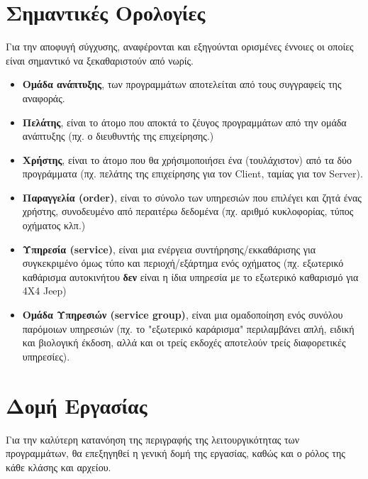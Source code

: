     \section{Σημαντικές Ορολογίες}
    \label{sec:SectionName1.2}
    Για την αποφυγή σύγχυσης, αναφέρονται και εξηγούνται ορισμένες έννοιες οι οποίες είναι σημαντικό να ξεκαθαριστούν από νωρίς.

    \begin{itemize}
        \item \textbf{Ομάδα ανάπτυξης}, των προγραμμάτων αποτελείται από τους συγγραφείς της αναφοράς.
        
        \item \textbf{Πελάτης}, είναι το άτομο που αποκτά το ζέυγος προγραμμάτων από την ομάδα ανάπτυξης (πχ. ο διευθυντής της επιχείρησης.)
        
        \item \textbf{Χρήστης}, είναι το άτομο που θα χρήσιμοποιήσει ένα (τουλάχιστον) από τα δύο προγράμματα (πχ. πελάτης της επιχείρησης για τον Client, ταμίας για τον Server).
        
        \item \textbf{Παραγγελία (order)}, είναι το σύνολο των υπηρεσιών που επιλέγει και ζητά ένας χρήστης, συνοδευμένο από περαιτέρω δεδομένα (πχ. αριθμό κυκλοφορίας, τύπος οχήματος κλπ.) 
        
        \item \textbf{Υπηρεσία (service)}, είναι μια ενέργεια συντήρησης/εκκαθάρισης για συγκεκριμένο όμως τύπο και περιοχή/εξάρτημα ενός οχήματος (πχ. εξωτερικό καθάρισμα αυτοκινήτου \textbf{δεν} είναι η ίδια υπηρεσία με το εξωτερικό καθαρισμό για 4X4 Jeep)
        
        \item \textbf{Ομάδα Υπηρεσιών (service group)}, είναι μια ομαδοποίηση ενός συνόλου παρόμοιων υπηρεσιών (πχ. το "εξωτερικό καράρισμα" περιλαμβάνει απλή, ειδική και βιολογική έκδοση, αλλά και οι τρείς εκδοχές αποτελούν τρείς διαφορετικές υπηρεσίες).    
    \end{itemize}

     

    \section{Δομή Εργασίας}
    \label{sec:SectionName1.3}
    Για την καλύτερη κατανόηση της περιγραφής της λειτουργικότητας των προγραμμάτων, θα επεξηγηθεί η γενική δομή της εργασίας, καθώς και ο ρόλος της κάθε κλάσης και αρχείου. 
    
